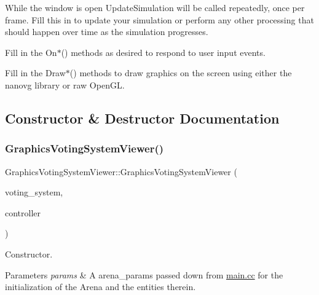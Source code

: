 While the window is open Update\+Simulation will be called repeatedly, once per frame. Fill this in to update your simulation or perform any other processing that should happen over time as the simulation progresses.

Fill in the {\ttfamily On$\ast$()} methods as desired to respond to user input events.

Fill in the {\ttfamily Draw$\ast$()} methods to draw graphics on the screen using either the {\ttfamily nanovg} library or raw {\ttfamily Open\+GL}. 

\subsection{Constructor \& Destructor Documentation}
\mbox{\label{classGraphicsVotingSystemViewer_a1664de5d9143fe92cdd4eaa483ca7a6d}} 
\subsubsection{\texorpdfstring{Graphics\+Voting\+System\+Viewer()}{GraphicsVotingSystemViewer()}}
{\footnotesize\ttfamily Graphics\+Voting\+System\+Viewer\+::\+Graphics\+Voting\+System\+Viewer (\begin{DoxyParamCaption}\item[{\hyperlink{classVotingSystem}{Voting\+System} $\ast$}]{voting\+\_\+system,  }\item[{\hyperlink{classController}{Controller} $\ast$}]{controller }\end{DoxyParamCaption})\hspace{0.3cm}{\ttfamily [explicit]}}



Constructor. 


\begin{DoxyParams}{Parameters}
{\em params} & A arena\+\_\+params passed down from \hyperlink{main_8cc}{main.\+cc} for the initialization of the Arena and the entities therein. \\
\hline
\end{DoxyParams}
\mbox{\label{classGraphicsVotingSystemViewer_a6a47acef4e0c072857b8487146766a11}} 

